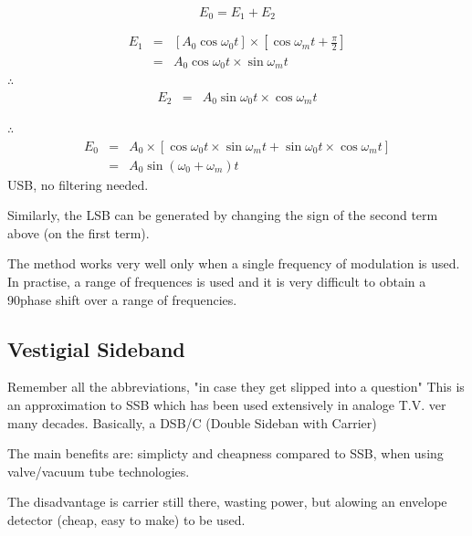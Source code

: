 \documentclass[11pt]{article} %
\begin{document}

\begin{equation}
E_0 = E_1+E_2
\end{equation}

\begin{eqnarray}
E_1 &=& \left[ A_0 \cos{\omega_0 t}\right] \times \left[ \cos{\omega_m t + \frac{\pi}{2}}\right]\nonumber \\
&=& A_0 \cos{\omega_0t}\times \sin{\omega_m t} 
\end{eqnarray}
$\therefore$
\begin{eqnarray}
E_2 &=& A_0 \sin{\omega_0t}\times \cos{\omega_m t}
\end{eqnarray}

$\therefore$
\begin{eqnarray}
E_0 &=& A_0 \times \left[\cos{\omega_0t}\times \sin{\omega_m t}+  \sin{\omega_0t}\times \cos{\omega_m t}\right] \nonumber \\
&=& A_0 \sin{\left(\omega_0 + \omega_m\right)} t
\end{eqnarray}
USB, no filtering needed.

Similarly, the LSB can be generated by changing the sign of the second term above (on the first term).

The method works very well only when a single frequency of modulation is used. In practise, a range of frequences is used and it is very difficult to obtain a 90\textdegree phase shift over a range of frequencies.

\subsection{Vestigial Sideband}
Remember all the abbreviations, "in case they get slipped into a question"
This is an approximation to SSB which has been used extensively in analoge T.V. ver many decades. Basically, a DSB/C (Double Sideban with Carrier)


The main benefits are: simplicty and cheapness compared to SSB, when using valve/vacuum tube technologies.

The disadvantage is carrier still there, wasting power, but alowing an envelope detector (cheap, easy to make) to be used.
\end{document}
